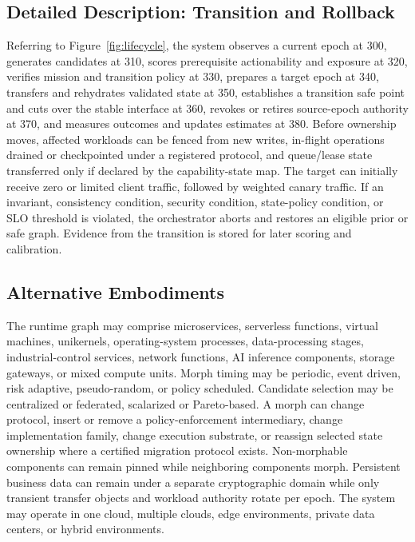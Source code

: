 \documentclass[11pt,letterpaper]{article}
\begin{document}
\subsection{Detailed Description: Transition and Rollback}

Referring to Figure~\ref{fig:lifecycle}, the system observes a current epoch at 300, generates candidates at 310, scores prerequisite actionability and exposure at 320, verifies mission and transition policy at 330, prepares a target epoch at 340, transfers and rehydrates validated state at 350, establishes a transition safe point and cuts over the stable interface at 360, revokes or retires source-epoch authority at 370, and measures outcomes and updates estimates at 380. Before ownership moves, affected workloads can be fenced from new writes, in-flight operations drained or checkpointed under a registered protocol, and queue/lease state transferred only if declared by the capability-state map. The target can initially receive zero or limited client traffic, followed by weighted canary traffic. If an invariant, consistency condition, security condition, state-policy condition, or SLO threshold is violated, the orchestrator aborts and restores an eligible prior or safe graph. Evidence from the transition is stored for later scoring and calibration.

\subsection{Alternative Embodiments}

The runtime graph may comprise microservices, serverless functions, virtual machines, unikernels, operating-system processes, data-processing stages, industrial-control services, network functions, AI inference components, storage gateways, or mixed compute units. Morph timing may be periodic, event driven, risk adaptive, pseudo-random, or policy scheduled. Candidate selection may be centralized or federated, scalarized or Pareto-based. A morph can change protocol, insert or remove a policy-enforcement intermediary, change implementation family, change execution substrate, or reassign selected state ownership where a certified migration protocol exists. Non-morphable components can remain pinned while neighboring components morph. Persistent business data can remain under a separate cryptographic domain while only transient transfer objects and workload authority rotate per epoch. The system may operate in one cloud, multiple clouds, edge environments, private data centers, or hybrid environments.
\end{document}

